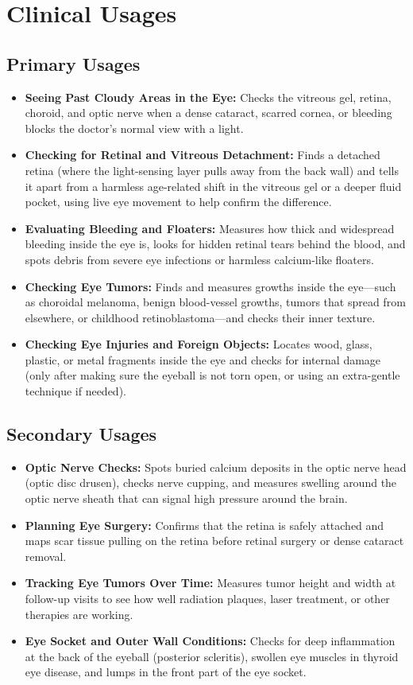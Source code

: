 \section{Clinical Usages}

\subsection{Primary Usages}
\begin{itemize}
    \item \textbf{Seeing Past Cloudy Areas in the Eye:} Checks the vitreous gel, retina, choroid, and optic nerve when a dense cataract, scarred cornea, or bleeding blocks the doctor's normal view with a light.
    \item \textbf{Checking for Retinal and Vitreous Detachment:} Finds a detached retina (where the light-sensing layer pulls away from the back wall) and tells it apart from a harmless age-related shift in the vitreous gel or a deeper fluid pocket, using live eye movement to help confirm the difference.
    \item \textbf{Evaluating Bleeding and Floaters:} Measures how thick and widespread bleeding inside the eye is, looks for hidden retinal tears behind the blood, and spots debris from severe eye infections or harmless calcium-like floaters.
    \item \textbf{Checking Eye Tumors:} Finds and measures growths inside the eye---such as choroidal melanoma, benign blood-vessel growths, tumors that spread from elsewhere, or childhood retinoblastoma---and checks their inner texture.
    \item \textbf{Checking Eye Injuries and Foreign Objects:} Locates wood, glass, plastic, or metal fragments inside the eye and checks for internal damage (only after making sure the eyeball is not torn open, or using an extra-gentle technique if needed).
\end{itemize}

\subsection{Secondary Usages}
\begin{itemize}
    \item \textbf{Optic Nerve Checks:} Spots buried calcium deposits in the optic nerve head (optic disc drusen), checks nerve cupping, and measures swelling around the optic nerve sheath that can signal high pressure around the brain.
    \item \textbf{Planning Eye Surgery:} Confirms that the retina is safely attached and maps scar tissue pulling on the retina before retinal surgery or dense cataract removal.
    \item \textbf{Tracking Eye Tumors Over Time:} Measures tumor height and width at follow-up visits to see how well radiation plaques, laser treatment, or other therapies are working.
    \item \textbf{Eye Socket and Outer Wall Conditions:} Checks for deep inflammation at the back of the eyeball (posterior scleritis), swollen eye muscles in thyroid eye disease, and lumps in the front part of the eye socket.
\end{itemize}

